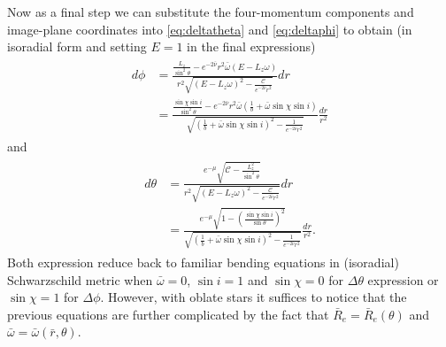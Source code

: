 \documentclass[iop, usenatbib]{emulateapj}
\newcommand{\rb}{\ensuremath{\bar{r}}}
\newcommand{\wb}{\ensuremath{\bar{\omega}}}
\newcommand{\nub}{\ensuremath{\bar{\nu}}}
\begin{document}
Now as a final step we can substitute the four-momentum components and image-plane coordinates into \eqref{eq:deltatheta} and \eqref{eq:deltaphi} to obtain (in isoradial form and setting $E=1$ in the final expressions)
\begin{align}\begin{split}\label{eq:dphi}
 d\phi &= 
 \frac{ \frac{L_z}{\sin^2\theta} - e^{-2\nub}r^2\wb(E-L_z \omega)}{r^2 \sqrt{(E-L_z\omega)^2-\frac{\mathcal{C}}{e^{-2\nub}r^2}}} dr \\
 &=  \frac{\frac{\sin\chi \sin i}{\sin^2\theta} - e^{-2\nub}r^2\wb \left(\frac{1}{b} + \wb \sin\chi \sin i \right)}{\sqrt{\left(\frac{1}{b} + \wb \sin\chi \sin i \right)^2 - \frac{1}{e^{-2\nub} r^2}}} \frac{dr}{r^2}
\end{split}\end{align}
and
\begin{align}\begin{split}\label{eq:dtheta}
    d\theta &=
    \frac{e^{-\mu}\sqrt{\mathcal{C} - \frac{L_z^2}{\sin^2\theta}}}{r^2\sqrt{(E-L_z\omega)^2-\frac{\mathcal{C}}{e^{-2\nub}r^2}}} dr \\
    &= \frac{e^{-\mu} \sqrt{1-\left(\frac{\sin\chi \sin i}{\sin\theta}\right)^2}}{\sqrt{\left(\frac{1}{b} + \wb \sin\chi \sin i \right)^2 - \frac{1}{e^{-2\nub} r^2}}} \frac{dr}{r^2}.
\end{split}\end{align}
Both expression reduce back to familiar bending equations in (isoradial) Schwarzschild metric when $\wb=0$, $\sin i = 1$ and $\sin\chi = 0$ for $\Delta\theta$ expression or $\sin\chi = 1$ for $\Delta\phi$.
However, with oblate stars it suffices to notice that the previous equations are further complicated by the fact that $\bar{R}_e = \bar{R}_e(\theta)$ and $\wb = \wb(\rb, \theta)$.
\end{document}
